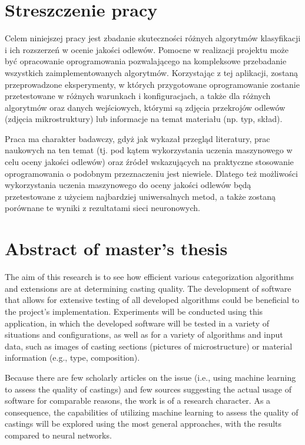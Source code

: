 \section*{Streszczenie pracy}

Celem niniejszej pracy jest zbadanie skuteczności różnych algorytmów klasyfikacji i ich rozszerzeń w ocenie jakości odlewów. Pomocne w realizacji projektu może być opracowanie oprogramowania pozwalającego na kompleksowe przebadanie wszystkich zaimplementowanych algorytmów. Korzystając z tej aplikacji, zostaną przeprowadzone eksperymenty, w których przygotowane oprogramowanie zostanie przetestowane w różnych warunkach i konfiguracjach, a także dla różnych algorytmów oraz danych wejściowych, którymi są zdjęcia przekrojów odlewów (zdjęcia mikrostruktury) lub informacje na temat materiału (np. typ, skład). 

Praca ma charakter badawczy, gdyż jak wykazał przegląd literatury, prac naukowych na ten temat (tj. pod kątem wykorzystania uczenia maszynowego w celu oceny jakości odlewów) oraz źródeł wskazujących na praktyczne stosowanie oprogramowania o podobnym przeznaczeniu jest niewiele. Dlatego też możliwości wykorzystania uczenia maszynowego do oceny jakości odlewów będą przetestowane z użyciem najbardziej uniwersalnych metod, a także zostaną porównane te wyniki z rezultatami sieci neuronowych.


\section*{Abstract of master's thesis}
The aim of this research is to see how efficient various categorization algorithms and extensions are at determining casting quality. The development of software that allows for extensive testing of all developed algorithms could be beneficial to the project's implementation. Experiments will be conducted using this application, in which the developed software will be tested in a variety of situations and configurations, as well as for a variety of algorithms and input data, such as images of casting sections (pictures of microstructure) or material information (e.g., type, composition).

Because there are few scholarly articles on the issue (i.e., using machine learning to assess the quality of castings) and few sources suggesting the actual usage of software for comparable reasons, the work is of a research character. As a consequence, the capabilities of utilizing machine learning to assess the quality of castings will be explored using the most general approaches, with the results compared to neural networks.


















